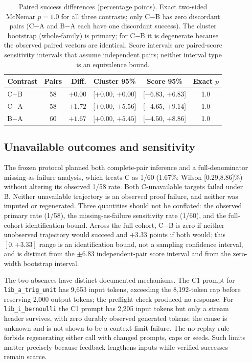 \documentclass[runningheads,a4paper]{llncs}
\begin{document}
\begin{table}[tbp]
\caption{Paired success differences (percentage points). Exact two-sided McNemar
$p=1.0$ for all three contrasts; only C$-$B has zero discordant pairs (C$-$A and
B$-$A each have one discordant success). The cluster bootstrap (whole-family) is
primary; for C$-$B it is degenerate because the observed paired vectors are
identical. Score intervals are paired-score sensitivity intervals that assume
independent pairs; neither interval type is an equivalence bound.}
\label{tab:paired}
\centering\small
\begin{tabular}{lcrccc}
\toprule
Contrast & Pairs & Diff. & Cluster 95\% & Score 95\% & Exact $p$\\
\midrule
C$-$B & 58 & $+0.00$ & [$+0.00$, $+0.00$] & [$-6.83$, $+6.83$] & 1.0\\
C$-$A & 58 & $+1.72$ & [$+0.00$, $+5.56$] & [$-4.65$, $+9.14$] & 1.0\\
B$-$A & 60 & $+1.67$ & [$+0.00$, $+5.45$] & [$-4.50$, $+8.86$] & 1.0\\
\bottomrule
\end{tabular}
\end{table}

\subsection{Unavailable outcomes and sensitivity}
The frozen protocol planned both complete-pair inference and a full-denominator
missing-as-failure analysis, which treats C as 1/60 (1.67\%; Wilson [0.29,8.86]\%)
without altering its observed 1/58 rate. Both C-unavailable targets failed under
B. Neither unavailable trajectory is an observed proof failure, and neither was imputed or regenerated. Three quantities should not be conflated: the observed primary rate (1/58), the
missing-as-failure sensitivity rate (1/60), and the full-cohort identification
bound. Across the full cohort, C$-$B is zero if neither unobserved trajectory would
succeed and $+3.33$ points if both would; this $[0,+3.33]$ range is an
identification bound, not a sampling confidence interval, and is distinct from the
$\pm6.83$ independent-pair score interval and from the zero-width bootstrap interval.

The two absences have distinct documented mechanisms. The C1 prompt for
\texttt{lib\_a\_trig\_unit} has 9,653 input tokens, exceeding the
8,192-token cap before reserving 2,000 output tokens; the preflight check produced
no response. For \texttt{lib\_i\_bernoulli} the C1 prompt has 2,205 input tokens
but only a stream header survives, with zero durably observed generated tokens;
the cause is unknown and is not shown to be a context-limit failure. The no-replay
rule forbids regenerating either call with changed prompts, caps or seeds. Such
limits matter precisely because feedback lengthens inputs while verified successes
remain scarce.
\end{document}

